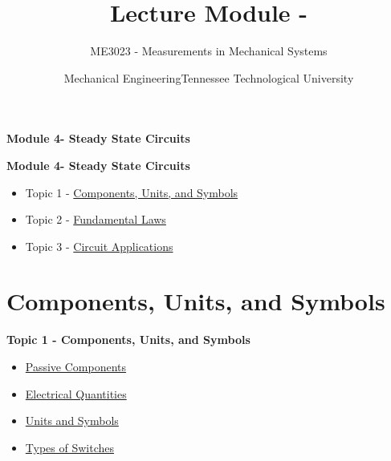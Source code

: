 \documentclass[fleqn]{ltx-talk} %
\author{ME3023 - Measurements in Mechanical Systems} %
\title{Lecture Module - \moduletitle}
\date{Mechanical Engineering\vspc Tennessee Technological University}
\newcommand{\MNUM}{4\hspace{2mm}} %
\newcommand{\moduletitle}{Steady State Circuits}
\newcommand{\sectionItitle}{Components, Units, and Symbols}
\newcommand{\sectionIItitle}{Fundamental Laws}
\newcommand{\sectionIIItitle}{Circuit Applications}
\newcommand{\sectionIsubsectionItitle}{Passive Components}
\newcommand{\sectionIsubsectionIItitle}{Electrical Quantities}
\newcommand{\sectionIsubsectionIIItitle}{Units and Symbols}
\newcommand{\sectionIsubsectionIVtitle}{Types of Switches}
\begin{document}
	\lstset{language=MATLAB,basicstyle=\ttfamily\small,showstringspaces=false}

  
  \begin{frame}
      \begin{framed}\Large \textbf{Module \MNUM - \moduletitle}\end{framed} \vspace{5mm}
  \end{frame}

	\begin{frame} 
		\large \textbf{Module \MNUM - \moduletitle} \vspace{3mm}\\

		\begin{itemize}
			\item Topic 1 - \hyperref[sectionI]{\sectionItitle} \vspc %
			\item Topic 2 - \hyperref[sectionII]{\sectionIItitle} \vspc %
			\item Topic 3 - \hyperref[sectionIII]{\sectionIIItitle} \vspc %
		\end{itemize}

	\end{frame}

	\section{\sectionItitle}\label{sectionI}

		\begin{frame} 
			\large \textbf{Topic 1 - \sectionItitle} \vspace{3mm}\\

			\begin{itemize}
				\item \hyperref[sectionIsubsectionI]{\sectionIsubsectionItitle} \vspc %
				\item \hyperref[sectionIsubsectionII]{\sectionIsubsectionIItitle} \vspc %
				\item \hyperref[sectionIsubsectionIII]{\sectionIsubsectionIIItitle} \vspc %
				\item \hyperref[sectionIsubsectionIV]{\sectionIsubsectionIVtitle} \vspc %
			\end{itemize}
		\end{frame}
		
\end{document}
